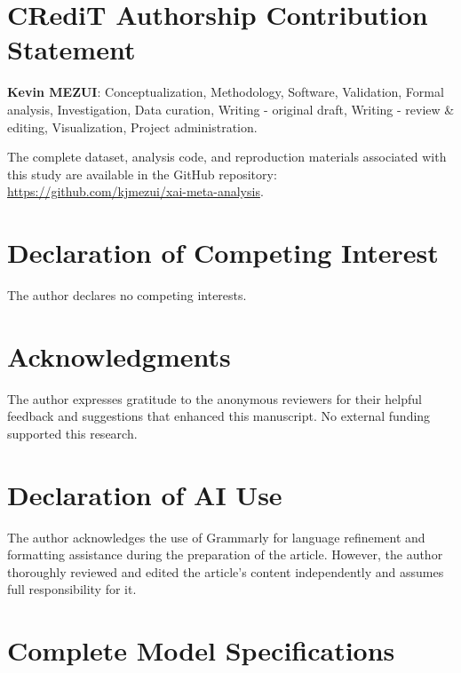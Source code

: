 \documentclass[preprint,12pt]{elsarticle}
\begin{document}
\section*{CRediT Authorship Contribution Statement}

\textbf{Kevin MEZUI}: Conceptualization, Methodology, Software, Validation, Formal analysis, Investigation, Data curation, Writing - original draft, Writing - review \& editing, Visualization, Project administration.


The complete dataset, analysis code, and reproduction materials associated with this study are available in the GitHub repository:  \url{https://github.com/kjmezui/xai-meta-analysis}.

\section*{Declaration of Competing Interest}

The author declares no competing interests.

\section*{Acknowledgments}

The author expresses gratitude to the anonymous reviewers for their helpful feedback and suggestions that enhanced this manuscript. No external funding supported this research.

\section*{Declaration of AI Use}
The author acknowledges the use of Grammarly for language refinement and formatting assistance during the preparation of the article. However, the author thoroughly reviewed and edited the article's content independently and assumes full responsibility for it.

\appendix

\section{Complete Model Specifications}
\label{app:model_specs}
\end{document}
